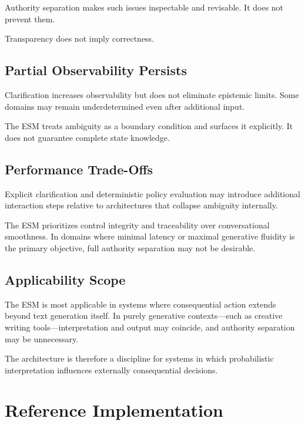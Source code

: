 \documentclass[11pt]{article}
\begin{document}
Authority separation makes such issues inspectable and revisable. It does not prevent them.

Transparency does not imply correctness.

\subsection{Partial Observability Persists}

Clarification increases observability but does not eliminate epistemic limits. Some domains may remain underdetermined even after additional input.

The ESM treats ambiguity as a boundary condition and surfaces it explicitly. It does not guarantee complete state knowledge.

\subsection{Performance Trade-Offs}

Explicit clarification and deterministic policy evaluation may introduce additional interaction steps relative to architectures that collapse ambiguity internally.

The ESM prioritizes control integrity and traceability over conversational smoothness. In domains where minimal latency or maximal generative fluidity is the primary objective, full authority separation may not be desirable.

\subsection{Applicability Scope}

The ESM is most applicable in systems where consequential action extends beyond text generation itself. In purely generative contexts—such as creative writing tools—interpretation and output may coincide, and authority separation may be unnecessary.

The architecture is therefore a discipline for systems in which probabilistic interpretation influences externally consequential decisions.



\section{Reference Implementation}
\end{document}

